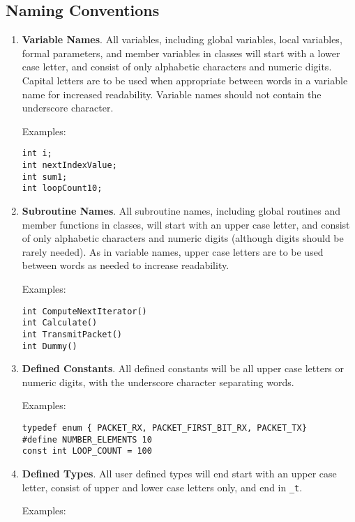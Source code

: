 \documentclass[11pt]{article}
\begin{document}
\subsection{Naming Conventions}
\begin{enumerate}
\item {\bf Variable Names}.  All variables, including global variables,
local variables, formal parameters, 
and member variables in classes will start with a
lower case letter, and consist of only alphabetic characters and numeric
digits.  Capital letters are to be used when appropriate between words
in a variable name for increased readability.  
Variable names should not contain the underscore character.

Examples:

{\tt int i;}\\
{\tt int nextIndexValue;}\\
{\tt int sum1;}\\
{\tt int loopCount10;}

\item {\bf Subroutine Names}.  All subroutine names, including global
routines and member functions in classes, will start with an upper case
letter, and consist of only alphabetic characters and numeric digits
(although digits should be rarely needed).
As in variable names, upper case letters are to be used between words as needed
to increase readability.

Examples:

{\tt int ComputeNextIterator()}\\
{\tt int Calculate()}\\
{\tt int TransmitPacket()}\\
{\tt int Dummy()}

\item {\bf Defined Constants}.  All defined constants will be all upper
case letters or numeric digits, with the underscore character separating
words.  

Examples:

{\tt typedef enum \{ PACKET\_RX, PACKET\_FIRST\_BIT\_RX, PACKET\_TX\} }\\
{\tt \#define NUMBER\_ELEMENTS 10}\\
{\tt const int LOOP\_COUNT = 100}

\item {\bf Defined Types}.  All user defined types will end start with
an upper case letter, consist of upper and lower case letters only, and
end in {\tt \_t}.

Examples:


\end{enumerate}
\end{document}
